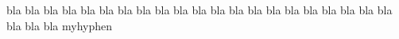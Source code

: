 \documentclass[a4paper]{article}
\begin{document}
bla bla bla bla bla bla bla bla bla bla bla bla bla bla bla bla bla
bla bla bla bla bla bla bla my\-hyphen
\end{document}
